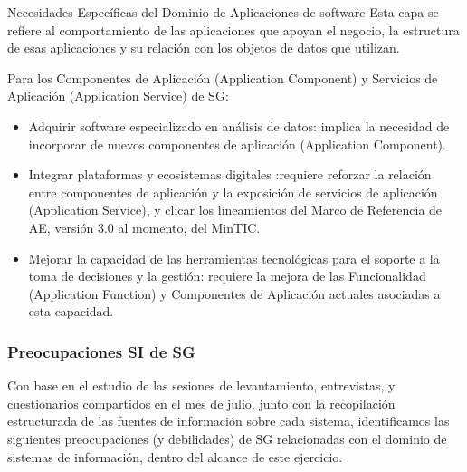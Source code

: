 \documentclass[
	a4paper, %
	12pt, %
]{include/CSSullivanBusinessReport}
\def\tightlist{}
\begin{document}
Necesidades Específicas del Dominio de Aplicaciones de software Esta
capa se refiere al comportamiento de las aplicaciones que apoyan el
negocio, la estructura de esas aplicaciones y su relación con los
objetos de datos que utilizan.

Para los Componentes de Aplicación (Application Component) y Servicios
de Aplicación (Application Service) de SG:

\begin{itemize}
\tightlist
\item
  Adquirir software especializado en análisis de datos: implica la
  necesidad de incorporar de nuevos componentes de aplicación
  (Application Component).
\item
  Integrar plataformas y ecosistemas digitales :requiere reforzar la
  relación entre componentes de aplicación y la exposición de servicios
  de aplicación (Application Service), y clicar los lineamientos del
  Marco de Referencia de AE, versión 3.0 al momento, del MinTIC.
\item
  Mejorar la capacidad de las herramientas tecnológicas para el soporte
  a la toma de decisiones y la gestión: requiere la mejora de las
  Funcionalidad (Application Function) y Componentes de Aplicación
  actuales asociadas a esta capacidad.
\end{itemize}

\subsubsection{Preocupaciones SI de
SG}\label{sec:preocupaciones-si-de-sg}

Con base en el estudio de las sesiones de levantamiento, entrevistas, y
cuestionarios compartidos en el mes de julio, junto con la recopilación
estructurada de las fuentes de información sobre cada sistema,
identificamos las siguientes preocupaciones (y debilidades) de SG
relacionadas con el dominio de sistemas de información, dentro del
alcance de este ejercicio.
\end{document}
